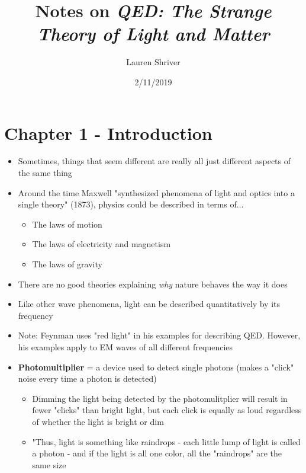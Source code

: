 \documentclass[a4paper]{article}
\title{Notes on \textit{QED: The Strange Theory of Light and Matter}}
\author{Lauren Shriver}
\date{2/11/2019}
\begin{document}
	\maketitle
	\section*{Chapter 1 - Introduction}
	    \begin{itemize}
	        \item Sometimes, things that seem different are really all just different aspects of the same thing
	        \item Around the time Maxwell "synthesized phenomena of light and optics into a single theory" (1873), physics could be described in terms of...
	       \begin{itemize}
	           \item The laws of motion
	           \item The laws of electricity and magnetism
	           \item The laws of gravity
	       \end{itemize}
	       \item There are no good theories explaining \textit{why} nature behaves the way it does
	       \item Like other wave phenomena, light can be described quantitatively by its frequency 
	       \item Note: Feynman uses "red light" in his examples for describing QED. However, his examples apply to EM waves of all different frequencies 
	       \item \textbf{Photomultiplier} = a device used to detect single photons (makes a "click" noise every time a photon is detected)
	       \begin{itemize}
	           \item Dimming the light being detected by the photomulitplier will result in fewer "clicks" than bright light, but each click is equally as loud regardless of whether the light is bright or dim
	           \item "Thus, light is something like raindrops - each little lump of light is called a photon - and if the light is all one color, all the "raindrops" are the same size 
	       \end{itemize}
	    \end{itemize}
\end{document}
